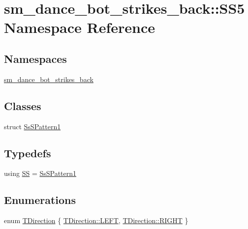 \hypertarget{namespacesm__dance__bot__strikes__back_1_1SS5}{}\section{sm\+\_\+dance\+\_\+bot\+\_\+strikes\+\_\+back\+:\+:S\+S5 Namespace Reference}
\label{namespacesm__dance__bot__strikes__back_1_1SS5}
\subsection*{Namespaces}
\begin{DoxyCompactItemize}
\item 
 \hyperlink{namespacesm__dance__bot__strikes__back_1_1SS5_1_1sm__dance__bot__strikes__back}{sm\+\_\+dance\+\_\+bot\+\_\+strikes\+\_\+back}
\end{DoxyCompactItemize}
\subsection*{Classes}
\begin{DoxyCompactItemize}
\item 
struct \hyperlink{structsm__dance__bot__strikes__back_1_1SS5_1_1SsSPattern1}{Ss\+S\+Pattern1}
\end{DoxyCompactItemize}
\subsection*{Typedefs}
\begin{DoxyCompactItemize}
\item 
using \hyperlink{namespacesm__dance__bot__strikes__back_1_1SS5_a0b538a03cd46608c47302a6e1b6d7737}{SS} = \hyperlink{structsm__dance__bot__strikes__back_1_1SS5_1_1SsSPattern1}{Ss\+S\+Pattern1}
\end{DoxyCompactItemize}
\subsection*{Enumerations}
\begin{DoxyCompactItemize}
\item 
enum \hyperlink{namespacesm__dance__bot__strikes__back_1_1SS5_a9bfe9437a81f94ff39bae6daa0cec2e6}{T\+Direction} \{ \hyperlink{namespacesm__dance__bot__strikes__back_1_1SS5_a9bfe9437a81f94ff39bae6daa0cec2e6a684d325a7303f52e64011467ff5c5758}{T\+Direction\+::\+L\+E\+FT}, 
\hyperlink{namespacesm__dance__bot__strikes__back_1_1SS5_a9bfe9437a81f94ff39bae6daa0cec2e6a21507b40c80068eda19865706fdc2403}{T\+Direction\+::\+R\+I\+G\+HT}
 \}
\end{DoxyCompactItemize}


